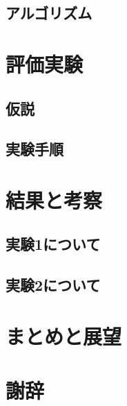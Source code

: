 \documentclass[12pt,a4j]{jreport}
\begin{document}
\section{アルゴリズム}




\chapter{評価実験}


\section{仮説}


\section{実験手順}




\chapter{結果と考察}


\section{実験1について}


\section{実験2について}





\chapter{まとめと展望}





\chapter*{謝辞}



\end{document}
